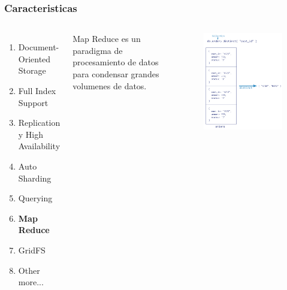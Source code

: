 \documentclass{beamer}
\begin{document}
\begin{frame}
\frametitle{Caracteristicas}
\begin{columns}[c] %

\begin{enumerate}
\item Document-Oriented Storage
\item Full Index Support
\item Replication y High Availability
\item Auto Sharding
\item Querying
\item \textbf{Map Reduce}
\item GridFS
\item Other more...
\end{enumerate}

Map Reduce es un paradigma de procesamiento de datos para condensar grandes volumenes de datos.
\begin{figure}
\includegraphics[width=0.5\linewidth]{distinct.png}
\end{figure}
\end{columns}
\end{frame}
\end{document}
